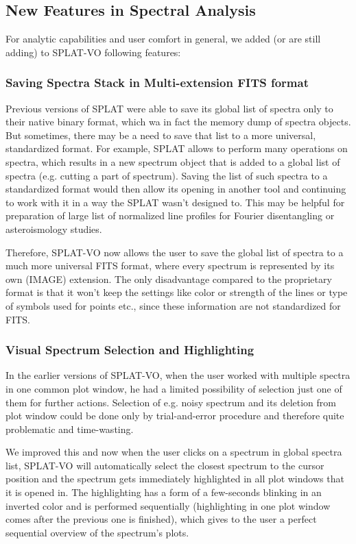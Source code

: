 \documentclass[final,authoryear,5p,times,twocolumn]{elsarticle}
\begin{document}
\subsection{New Features in Spectral Analysis}

For analytic capabilities and user comfort in general, we added (or
are still adding) to SPLAT-VO following features:
\subsubsection{Saving Spectra Stack in Multi-extension FITS format}

Previous versions of SPLAT were able to save its global list of spectra only to
their native binary format, which wa in fact the memory dump of spectra
objects. But sometimes, there may be a need to save that list to a more
universal, standardized format. For example, SPLAT allows to perform many
operations on spectra, which results in a new spectrum object that is added to
a global list of spectra (e.g. cutting a part of spectrum). Saving the list of
such spectra to a standardized format would then allow its opening in another
tool and continuing to work with it in a way the SPLAT wasn't designed to.
This may be helpful for preparation of large list of normalized line profiles
for Fourier disentangling or asteroismology studies.

Therefore, SPLAT-VO now allows the user to save the global list of spectra to a
much more universal FITS format, where every spectrum  is represented by its
own (IMAGE) extension.  The only disadvantage compared to the proprietary
format is that it won't keep the settings like color or strength of the lines
or type of symbols used for points etc., since these information  are not
standardized for FITS.


\subsubsection{Visual Spectrum Selection and Highlighting}

In the earlier versions of SPLAT-VO, when the user worked with multiple 
spectra in one common plot window, he  had a limited possibility of 
selection just one of them for further actions. Selection of e.g. noisy 
spectrum and its deletion from plot window could be done only by 
trial-and-error procedure and therefore quite problematic and time-wasting.

We improved this and now when the user clicks on a spectrum in global spectra
list, SPLAT-VO will automatically select the closest spectrum to the cursor
position and  the spectrum gets immediately highlighted in all plot windows
that it is opened in. The highlighting has a form of a few-seconds blinking in
an inverted color and is performed sequentially (highlighting in one plot
window comes after the previous one is finished), which gives to the user a
perfect sequential overview of the spectrum's plots.
\end{document}
